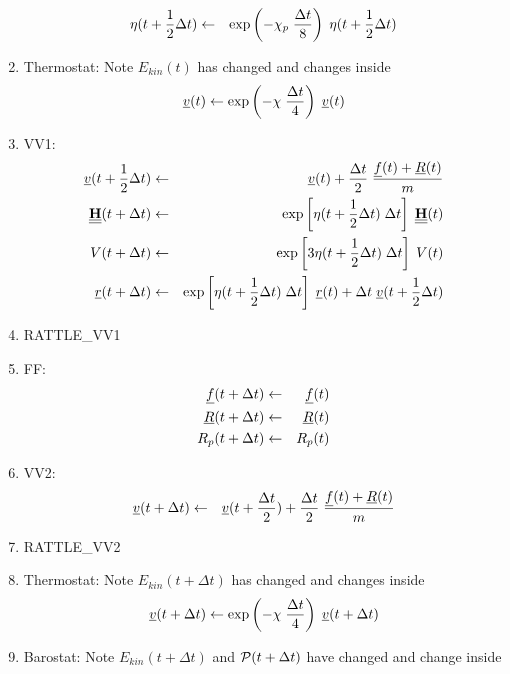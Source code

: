 \begin{enumerate}
\begin{eqnarray}
\eta (t + {1 \over 2} \Delta t) &\leftarrow& \exp \left( -\chi_{p} \; {\Delta t \over 8} \right)  \;
\eta (t + {1 \over 2} \Delta t) \nonumber
\end{eqnarray}
\item Thermostat: Note $E_{kin}(t)$ has changed and changes inside
\begin{equation}
\mbox{$\underline{v}$}(t) \leftarrow \exp \left( -\chi \; {\Delta t \over 4} \right) \; \mbox{$\underline{v}$}(t)
\end{equation}
\item VV1:
\begin{eqnarray}
\mbox{$\underline{v}$}(t + {1 \over 2} \Delta t) &\leftarrow& \mbox{$\underline{v}$}(t) +
{\Delta t \over 2} \; \frac{\mbox{$\underline{f}$}(t)+\mbox{$\underline{R}$}(t)}{m} \nonumber \\
\mbox{$\underline{\underline{\bf H}}$}(t + \Delta t) &\leftarrow& \exp \left[
\eta (t + {1 \over 2} \Delta t) \; \Delta t \right] \; \mbox{$\underline{\underline{\bf H}}$}(t) \nonumber \\
V(t + \Delta t) &\leftarrow& \exp \left[3 \eta (t + {1 \over 2} \Delta t) \;
\Delta t \right] \; V(t) \\
\mbox{$\underline{r}$}(t + \Delta t) &\leftarrow& \exp \left[ \eta (t + {1 \over 2} \Delta t) \; \Delta t \right] \;
\mbox{$\underline{r}$}(t) + \Delta t \; \mbox{$\underline{v}$}(t + {1 \over 2} \Delta t) \nonumber
\end{eqnarray}
\item RATTLE\_VV1
\item FF:
\begin{eqnarray}
\mbox{$\underline{f}$}(t + \Delta t) &\leftarrow& \mbox{$\underline{f}$}(t) \nonumber \\
\mbox{$\underline{R}$}(t + \Delta t) &\leftarrow& \mbox{$\underline{R}$}(t) \\
R_{p} (t + \Delta t) &\leftarrow& R_{p} (t) \nonumber
\end{eqnarray}
\item VV2:
\begin{eqnarray}
\mbox{$\underline{v}$}(t + \Delta t) &\leftarrow& \mbox{$\underline{v}$}(t + {\Delta t \over 2}) +
{\Delta t \over 2} \; \frac{\mbox{$\underline{f}$}(t)+\mbox{$\underline{R}$}(t)}{m}
\end{eqnarray}
\item RATTLE\_VV2
\item Thermostat: Note $E_{kin}(t + \Delta t)$ has changed and changes inside
\begin{equation}
\mbox{$\underline{v}$}(t + \Delta t) \leftarrow \exp \left( -\chi \; {\Delta t \over 4} \right) \; \mbox{$\underline{v}$}(t + \Delta t)
\end{equation}
\item Barostat: Note $E_{kin}(t + \Delta t)$ and ${\cal P}(t + \Delta t)$
have changed and change inside

\end{enumerate}
